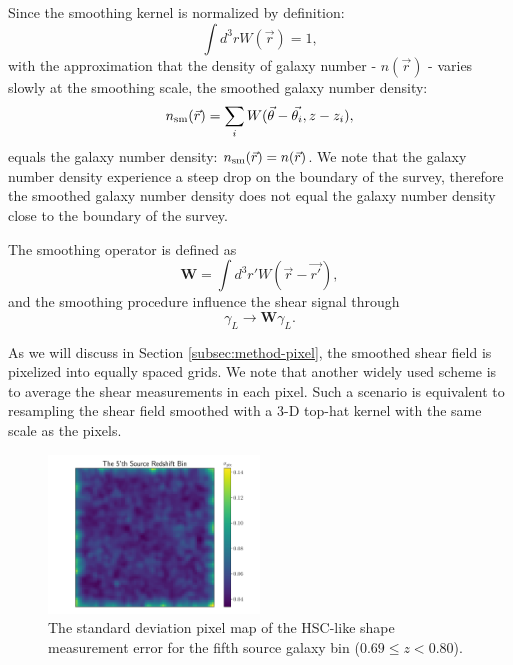 \documentclass[twocolumn]{aastex62}
\begin{document}
Since the smoothing kernel is normalized by definition:
\begin{equation}
\int d^3r W(\vec{r})=1,
\end{equation}
with the approximation that the density of galaxy number - $n(\vec{r})$ -
varies slowly at the smoothing scale, the
smoothed galaxy number density:
\begin{equation}\label{eq-numDesSmooth}
n_{\rm{sm}}(\vec{r})=\sum_i W(\vec{\theta}-\vec{\theta_i},z-z_i),
\end{equation}
equals the galaxy number density: $n_{\rm{sm}}(\vec{r})=n(\vec{r})$.
We note that the galaxy number density experience a steep drop on the boundary
of the survey, therefore the smoothed galaxy number density does not equal the
galaxy number density close to the boundary of the survey.

The smoothing operator is defined as
\begin{equation}
\mathbf{W} = \int d^3 r' W(\vec{r}-\vec{r'}),
\end{equation}
and the smoothing procedure influence the shear signal through
\begin{equation}
\gamma_L \rightarrow \mathbf{W} \gamma_L.
\end{equation}

As we will discuss in Section \ref{subsec:method-pixel}, the smoothed shear
field is pixelized into equally spaced grids. We note that another widely used
scheme is to average the shear measurements in each pixel.  Such a scenario is
equivalent to resampling the shear field smoothed with a $3$-D top-hat kernel
with the same scale as the pixels.

\begin{figure}[!t]
 \centering
 \includegraphics[width=0.5\textwidth]{noise_std_map_pix.pdf}
 \caption{The standard deviation pixel map of the HSC-like shape measurement error for the fifth source galaxy bin
        ($0.69 \leq z < 0.80 $).
        } \label{fig_noistdmap}
\end{figure}
\end{document}
